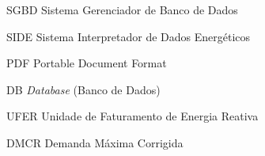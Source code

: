 \begin{siglas}
  \item[SGBD] Sistema Gerenciador de Banco de Dados
  \item[SIDE] Sistema Interpretador de Dados Energéticos
  \item[PDF] Portable Document Format
  \item[DB] \textit{Database} (Banco de Dados)
  \item[UFER] Unidade de Faturamento de Energia Reativa
  \item[DMCR] Demanda Máxima Corrigida
  
\end{siglas}